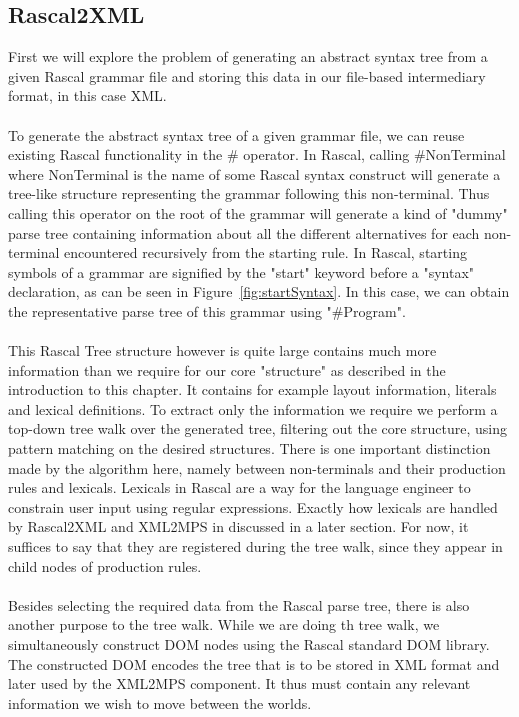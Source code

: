 \documentclass[a4paper]{article}
\begin{document}
\subsection{Rascal2XML}
First we will explore the problem of generating an abstract syntax tree from a given Rascal grammar file and storing this data in our file-based intermediary format, in this case XML. 
\\\\
To generate the abstract syntax tree of a given grammar file, we can reuse existing Rascal functionality in the \# operator. In Rascal, calling \#NonTerminal where NonTerminal is the name of some Rascal syntax construct will generate a tree-like structure representing the grammar following this non-terminal. Thus calling this operator on the root of the grammar will generate a kind of "dummy" parse tree containing information about all the different alternatives for each non-terminal encountered recursively from the starting rule. In Rascal, starting symbols of a grammar are signified by the "start" keyword before a "syntax" declaration, as can be seen in Figure~\ref{fig:startSyntax}. In this case, we can obtain the representative parse tree of this grammar using "\#Program". 
\\\\
This Rascal Tree structure however is quite large contains much more information than we require for our core "structure" as described in the introduction to this chapter. It contains for example layout information, literals and  lexical definitions. To extract only the information we require we perform a top-down tree walk over the generated tree, filtering out the core structure, using pattern matching on the desired structures. There is one important distinction made by the algorithm here, namely between non-terminals and their production rules and lexicals. Lexicals in Rascal are a way for the language engineer to constrain user input using regular expressions. Exactly how lexicals are handled by Rascal2XML and XML2MPS in discussed in a later section. For now, it suffices to say that they are registered during the tree walk, since they appear in child nodes of production rules. 
\\\\
Besides selecting the required data from the Rascal parse tree, there is also another purpose to the tree walk. While we are doing th tree walk, we simultaneously construct DOM nodes using the Rascal standard DOM library. 
The constructed DOM encodes the tree that is to be stored in XML format and later used by the XML2MPS component. It thus must contain any relevant information we wish to move between the worlds. 
\end{document}

